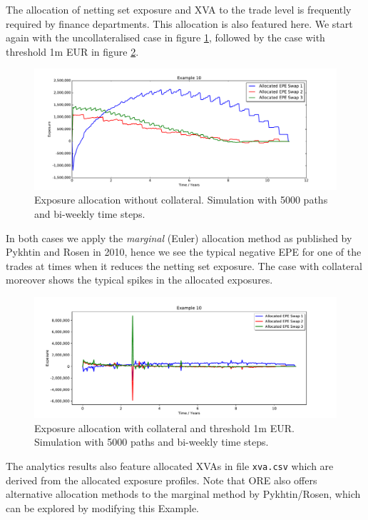 \medskip The allocation of netting set exposure and XVA to the trade level is frequently required by finance
departments. This allocation is also featured here. We start again with the uncollateralised
case in figure \ref{fig_12}, followed by the case with threshold 1m EUR in figure \ref{fig_13}.
\begin{figure}[h!]
\begin{center}
\includegraphics[scale=0.45]{examples/mpl_nocollateral_allocated_epe.pdf}
\end{center}
\caption{Exposure allocation without collateral. Simulation with 5000 paths and bi-weekly time steps.}
\label{fig_12}
\end{figure}
In both cases we apply the {\em marginal} (Euler) allocation method as published by Pykhtin and Rosen in 2010, hence we
see the typical negative EPE for one of the trades at times when it reduces the netting set exposure. The case with
collateral moreover shows the typical spikes in the allocated exposures.
\begin{figure}[h!]
\begin{center}
\includegraphics[scale=0.45]{examples/mpl_threshold_allocated_epe.pdf}
\end{center}
\caption{Exposure allocation with collateral and threshold 1m EUR. Simulation with 5000 paths and bi-weekly time steps.}
\label{fig_13}
\end{figure}
The analytics results also feature allocated XVAs in file {\tt xva.csv} which are derived from the allocated exposure
profiles. Note that ORE also offers alternative allocation methods to the marginal method by Pykhtin/Rosen, which can be
explored by modifying this Example.


